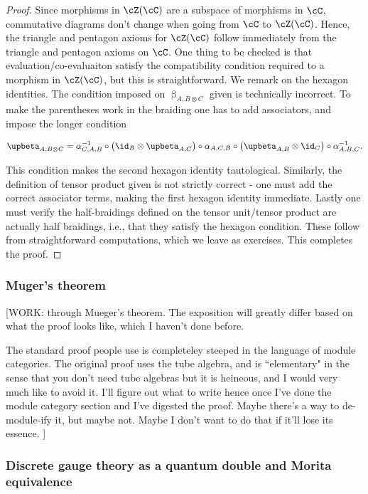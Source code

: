 \begin{proof} Since morphisms in $\cZ(\cC)$ are a subspace of morphisms in $\cC$, commutative diagrams don't change when going from $\cC$ to $\cZ(\cC)$. Hence, the triangle and pentagon axioms for $\cZ(\cC)$ follow immediately from the triangle and pentagon axioms on $\cC$. One thing to be checked is that evaluation/co-evaluaiton satisfy the compatibility condition required to a morphism in $\cZ(\cC)$, but this is straightforward. We remark on the hexagon identities. The condition imposed on $\upbeta_{A,B\otimes C}$ given is technically incorrect. To make the parentheses work in the braiding one has to add associators, and impose the longer condition

$$\upbeta_{A,B\otimes C}=\alpha_{C,A,B}^{-1}\circ \left(\id_{B}\otimes \upbeta_{A,C}\right)\circ \alpha_{A,C,B}\circ\left(\upbeta_{A,B}\otimes \id_C\right)\circ \alpha^{-1}_{A,B,C}.$$

This condition makes the second hexagon identity tautological. Similarly, the definition of tensor product given is not strictly correct - one must add the correct associator terms, making the first hexagon identity immediate. Lastly one must verify the half-braidings defined on the tensor unit/tensor product are actually half braidings, i.e., that they satisfy the hexagon condition. These follow from straightforward computations, which we leave as exercises. This completes the proof.

\end{proof}

\subsubsection{Muger's theorem}

[WORK: through Mueger's theorem. The exposition will greatly differ based on what the proof looks like, which I haven't done before.

The standard proof people use is completeley steeped in the language of module categories. The original proof uses the tube algebra, and is ``elementary" in the sense that you don't need tube algebras but it is heineous, and I would very much like to avoid it. I'll figure out what to write hence once I've done the module category section and I've digested the proof. Maybe there's a way to de-module-ify it, but maybe not. Maybe I don't want to do that if it'll lose its essence.
]

\subsubsection{Discrete gauge theory as a quantum double and Morita equivalence}

